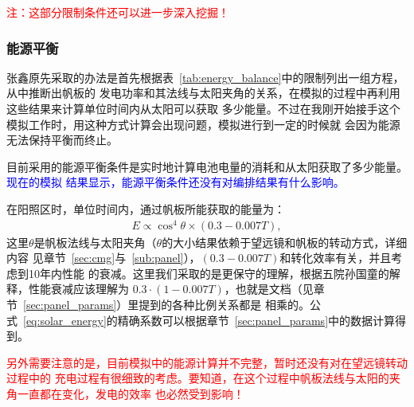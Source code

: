 \documentclass[a4paper,11pt]{ctexart}
\newcommand{\RT}[1]{\textcolor{red}{#1}}
\newcommand{\BT}[1]{\textcolor{blue}{#1}}
\begin{document}
\RT{注：这部分限制条件还可以进一步深入挖掘！}

\subsubsection{能源平衡}
张鑫原先采取的办法是首先根据表~\ref{tab:energy_balance}中的限制列出一组方程，从中推断出帆板的
发电功率和其法线与太阳夹角的关系，在模拟的过程中再利用这些结果来计算单位时间内从太阳可以获取
多少能量。不过在我刚开始接手这个模拟工作时，用这种方式计算会出现问题，模拟进行到一定的时候就
会因为能源无法保持平衡而终止。

目前采用的能源平衡条件是实时地计算电池电量的消耗和从太阳获取了多少能量。\BT{\heiti 现在的模拟
结果显示，能源平衡条件还没有对编排结果有什么影响。}

在阳照区时，单位时间内，通过帆板所能获取的能量为：
\begin{eqnarray}\label{eq:solar_energy}
E \propto \cos ^4\theta \times (0.3-0.007T),
\end{eqnarray}
这里$\theta$是帆板法线与太阳夹角（$\theta$的大小结果依赖于望远镜和帆板的转动方式，详细内容
见章节~\ref{sec:cmg}与~\ref{sub:panel}），$(0.3-0.007T)$和转化效率有关，并且考虑到10年内性能
的衰减。这里我们采取的是更保守的理解，根据五院孙国童的解释，性能衰减应该理解为
$0.3\cdot(1-0.007T)$，也就是文档（见章节~\ref{sec:panel_params}）里提到的各种比例关系都是
相乘的。公式~\ref{eq:solar_energy}的精确系数可以根据章节~\ref{sec:panel_params}中的数据计算得到。

\RT{\heiti 另外需要注意的是，目前模拟中的能源计算并不完整，暂时还没有对在望远镜转动过程中的
充电过程有很细致的考虑。要知道，在这个过程中帆板法线与太阳的夹角一直都在变化，发电的效率
也必然受到影响！}
\end{document}
